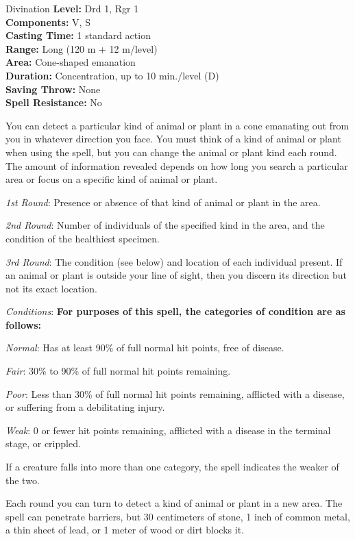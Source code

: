 {Divination}
{
	\textbf{Level:}
	Drd 1, Rgr 1\\
	\textbf{Components:}
	V, S\\
	\textbf{Casting Time:}
	1 standard action\\
	\textbf{Range:}
	Long (120 m + 12 m/level)\\
	\textbf{Area:}
	Cone-shaped emanation\\
	\textbf{Duration:}
	Concentration, up to 10 min./level (D)\\
	\textbf{Saving Throw:}
	None\\
	\textbf{Spell Resistance:}
	No\\
}
{
	You can detect a particular kind of animal or plant in a cone emanating out from you in whatever direction you face. You must think of a kind of animal or plant when using the spell, but you can change the animal or plant kind each round. The amount of information revealed depends on how long you search a particular area or focus on a specific kind of animal or plant.

	\textit{1st Round}:
	Presence or absence of that kind of animal or plant in the area.

	\textit{2nd Round}:
	Number of individuals of the specified kind in the area, and the condition of the healthiest specimen.

	\textit{3rd Round}:
	The condition (see below) and location of each individual present. If an animal or plant is outside your line of sight, then you discern its direction but not its exact location.

	\textit{Conditions}:
	\textbf{	For purposes of this spell, the categories of condition are as follows:}

	\textit{Normal}:
	Has at least 90\% of full normal hit points, free of disease.

	\textit{Fair}:
	30\% to 90\% of full normal hit points remaining.

	\textit{Poor}:
	Less than 30\% of full normal hit points remaining, afflicted with a disease, or suffering from a debilitating injury.

	\textit{Weak}:
	0 or fewer hit points remaining, afflicted with a disease in the terminal stage, or crippled.

	If a creature falls into more than one category, the spell indicates the weaker of the two.

	Each round you can turn to detect a kind of animal or plant in a new area. The spell can penetrate barriers, but 30 centimeters of stone, 1 inch of common metal, a thin sheet of lead, or 1 meter of wood or dirt blocks it.

}
